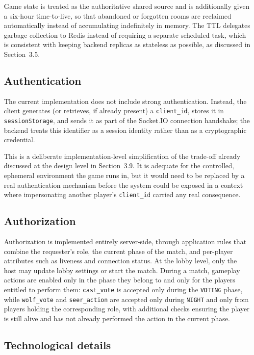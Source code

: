 \documentclass{scrartcl}
\begin{document}
Game state is treated as the authoritative shared source and is additionally given a six-hour time-to-live, so that abandoned or forgotten rooms are reclaimed automatically instead of accumulating indefinitely in memory. The TTL delegates garbage collection to Redis instead of requiring a separate scheduled task, which is consistent with keeping backend replicas as stateless as possible, as discussed in Section~3.5.

\subsection{Authentication}

The current implementation does not include strong authentication. Instead, the client generates (or retrieves, if already present) a \texttt{client\_id}, stores it in \texttt{sessionStorage}, and sends it as part of the Socket.IO connection handshake; the backend treats this identifier as a session identity rather than as a cryptographic credential.

This is a deliberate implementation-level simplification of the trade-off already discussed at the design level in Section~3.9. It is adequate for the controlled, ephemeral environment the game runs in, but it would need to be replaced by a real authentication mechanism before the system could be exposed in a context where impersonating another player's \texttt{client\_id} carried any real consequence.

\subsection{Authorization}

Authorization is implemented entirely server-side, through application rules that combine the requester's role, the current phase of the match, and per-player attributes such as liveness and connection status. At the lobby level, only the host may update lobby settings or start the match. During a match, gameplay actions are enabled only in the phase they belong to and only for the players entitled to perform them: \texttt{cast\_vote} is accepted only during the \texttt{VOTING} phase, while \texttt{wolf\_vote} and \texttt{seer\_action} are accepted only during \texttt{NIGHT} and only from players holding the corresponding role, with additional checks ensuring the player is still alive and has not already performed the action in the current phase.

\subsection{Technological details}
\end{document}
